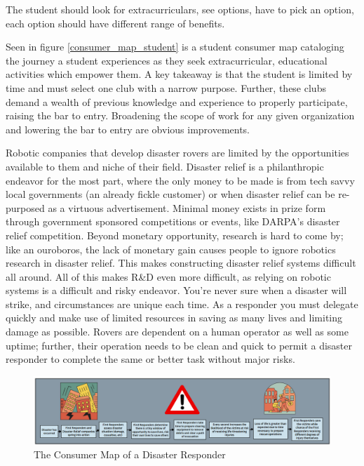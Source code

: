 \documentclass[a4paper, 10pt]{article}
\begin{document}
		The student should look for extracurriculars, see options, have to pick an option, each option should have different range of benefits.
		
		Seen in figure \ref{consumer_map_student} is a student consumer map cataloging the journey a student experiences as they seek extracurricular, educational activities which empower them. A key takeaway is that the student is limited by time and must select one club with a narrow purpose. Further, these clubs demand a wealth of previous knowledge and experience to properly participate, raising the bar to entry. Broadening the scope of work for any given organization and lowering the bar to entry are obvious improvements.
		
		Robotic companies that develop disaster rovers are limited by the opportunities available to them and niche of their field. Disaster relief is a philanthropic endeavor for the most part, where the only money to  be made is from tech savvy local governments (an already fickle customer) or when disaster relief can be re-purposed as a virtuous advertisement. Minimal money exists in prize form through government sponsored competitions or events, like DARPA's disaster relief competition. Beyond monetary opportunity, research is hard to come by; like an ouroboros, the lack of monetary gain causes people to ignore robotics research in disaster relief. This makes constructing disaster relief systems difficult all around. All of this makes R\&D even more difficult, as relying on robotic systems is a difficult and risky endeavor. You're never sure when a disaster will strike, and circumstances are unique each time. As a responder you must delegate quickly and make use of limited resources in saving as many lives and limiting damage as possible. Rovers are dependent on a human operator as well as some uptime; further, their operation needs to be clean and quick to permit a disaster responder to complete the same or better task without major risks.
		
		\begin{figure} [!h]
			\centering
			\includegraphics[scale=0.4]{Photos/Disaster Consumer Map}
			\caption{The Consumer Map of a Disaster Responder}
			\label{consumer_map_disaster}
		\end{figure}		
		
\end{document}
